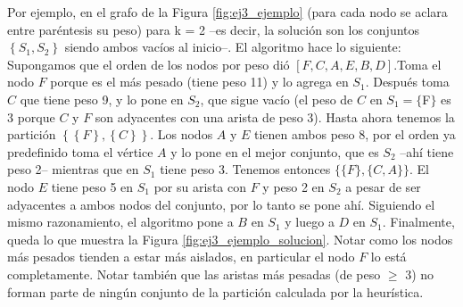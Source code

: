 Por ejemplo, en el grafo de la Figura \ref{fig:ej3_ejemplo} (para cada nodo se aclara entre paréntesis su peso) para k = 2 --es decir, la solución son los conjuntos $\left\{S_1, S_2\right\}$ siendo ambos vacíos al inicio--. El algoritmo hace lo siguiente: Supongamos que el orden de los nodos por peso dió $[F, C, A, E, B, D]$.Toma el nodo $F$ porque es el más pesado (tiene peso 11) y lo agrega en $S_1$. Después toma $C$ que tiene peso 9, y lo pone en $S_2$, que sigue vacío (el peso de $C$ en $S_1 = \{$F$\}$ es 3 porque $C$ y $F$ son adyacentes con una arista de peso 3). Hasta ahora tenemos la partición $\left\{ \left\{F\right\}, \left\{C\right\} \right\}$. Los nodos $A$ y $E$ tienen ambos peso 8, por el orden ya predefinido toma el vértice $A$ y lo pone en el mejor conjunto, que es $S_2$ --ahí tiene peso 2-- mientras que en $S_1$ tiene peso 3. Tenemos entonces $\{ \{F\}, \{C, A\} \}$. El nodo $E$ tiene peso 5 en $S_1$ por su arista con $F$ y peso 2 en $S_2$ a pesar de ser adyacentes a ambos nodos del conjunto, por lo tanto se pone ahí. Siguiendo el mismo razonamiento, el algoritmo pone a $B$ en $S_1$ y luego a $D$ en $S_1$. Finalmente, queda lo que muestra la Figura \ref{fig:ej3_ejemplo_solucion}. Notar como los nodos más pesados tienden a estar más aislados, en particular el nodo $F$ lo está completamente. Notar también que las aristas más pesadas (de peso $\geq$ 3) no forman parte de ningún conjunto de la partición calculada por la heurística.

